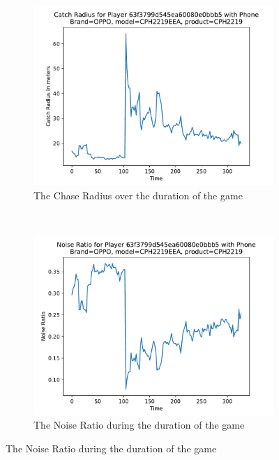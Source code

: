 \documentclass{l4proj}
\begin{document}
\begin{appendices}
\begin{figure}
    \centering
    \begin{subfigure}[b]{0.48\textwidth}
        \includegraphics[width=\textwidth]{images/OPPO-CPH2219EEA-122-radius.pdf}
        \caption{The Chase Radius over the duration of the game}
        \label{fig:oppocatchradius}
    \end{subfigure}
    ~ %
    \begin{subfigure}[b]{0.48\textwidth}
        \includegraphics[width=\textwidth]{images/OPPO-CPH2219EEA-123-noiseRatio.pdf}
        \caption{The Noise Ratio during the duration of the game}
        \label{fig:opponoiseratio}
    \end{subfigure}
    

\end{figure}
\end{appendices}
\end{document}
